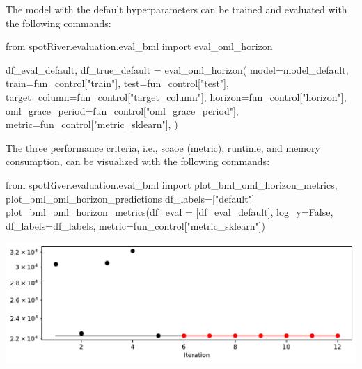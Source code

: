 \documentclass[
  letterpaper,
  DIV=11,
  numbers=noendperiod]{scrreprt}
\newenvironment{Shaded}{\begin{snugshade}}{\end{snugshade}}
\newcommand{\ImportTok}[1]{\textcolor[rgb]{0.00,0.46,0.62}{#1}}
\newcommand{\NormalTok}[1]{\textcolor[rgb]{0.00,0.23,0.31}{#1}}
\newcommand{\OperatorTok}[1]{\textcolor[rgb]{0.37,0.37,0.37}{#1}}
\newcommand{\StringTok}[1]{\textcolor[rgb]{0.13,0.47,0.30}{#1}}
\newcommand{\VariableTok}[1]{\textcolor[rgb]{0.07,0.07,0.07}{#1}}
\begin{document}
The model with the default hyperparameters can be trained and evaluated
with the following commands:

\begin{Shaded}
\begin{Highlighting}[]
\ImportTok{from}\NormalTok{ spotRiver.evaluation.eval\_bml }\ImportTok{import}\NormalTok{ eval\_oml\_horizon}

\NormalTok{df\_eval\_default, df\_true\_default }\OperatorTok{=}\NormalTok{ eval\_oml\_horizon(}
\NormalTok{                    model}\OperatorTok{=}\NormalTok{model\_default,}
\NormalTok{                    train}\OperatorTok{=}\NormalTok{fun\_control[}\StringTok{"train"}\NormalTok{],}
\NormalTok{                    test}\OperatorTok{=}\NormalTok{fun\_control[}\StringTok{"test"}\NormalTok{],}
\NormalTok{                    target\_column}\OperatorTok{=}\NormalTok{fun\_control[}\StringTok{"target\_column"}\NormalTok{],}
\NormalTok{                    horizon}\OperatorTok{=}\NormalTok{fun\_control[}\StringTok{"horizon"}\NormalTok{],}
\NormalTok{                    oml\_grace\_period}\OperatorTok{=}\NormalTok{fun\_control[}\StringTok{"oml\_grace\_period"}\NormalTok{],}
\NormalTok{                    metric}\OperatorTok{=}\NormalTok{fun\_control[}\StringTok{"metric\_sklearn"}\NormalTok{],}
\NormalTok{                )}
\end{Highlighting}
\end{Shaded}

The three performance criteria, i.e., scaoe (metric), runtime, and
memory consumption, can be visualized with the following commands:

\begin{Shaded}
\begin{Highlighting}[]
\ImportTok{from}\NormalTok{ spotRiver.evaluation.eval\_bml }\ImportTok{import}\NormalTok{ plot\_bml\_oml\_horizon\_metrics, plot\_bml\_oml\_horizon\_predictions}
\NormalTok{df\_labels}\OperatorTok{=}\NormalTok{[}\StringTok{"default"}\NormalTok{]}
\NormalTok{plot\_bml\_oml\_horizon\_metrics(df\_eval }\OperatorTok{=}\NormalTok{ [df\_eval\_default], log\_y}\OperatorTok{=}\VariableTok{False}\NormalTok{, df\_labels}\OperatorTok{=}\NormalTok{df\_labels, metric}\OperatorTok{=}\NormalTok{fun\_control[}\StringTok{"metric\_sklearn"}\NormalTok{])}
\end{Highlighting}
\end{Shaded}

\includegraphics{024_spot_hpt_river_friedman_hatr_files/figure-pdf/cell-27-output-1.pdf}
\end{document}
